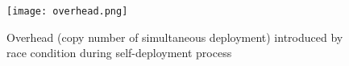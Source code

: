 \begin{figure}
\centering
\texttt{[image: overhead.png]}
\caption{Overhead (copy number of simultaneous deployment)
introduced by race condition during
self-deployment process}
\label{fig:overhead}
\end{figure}


